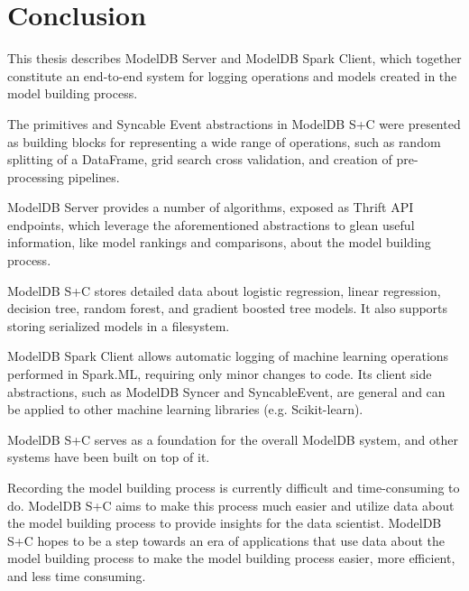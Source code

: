 \chapter{Conclusion}
This thesis describes ModelDB Server and ModelDB Spark Client, which together
constitute an end-to-end system for logging operations and models created in
the model building process.

The primitives and Syncable Event abstractions in ModelDB S+C were presented as
building blocks for representing a wide range of operations, such as random splitting
of a DataFrame, grid search cross validation, and creation of pre-processing pipelines.

ModelDB Server provides a number of algorithms, exposed as Thrift API endpoints, which
leverage the aforementioned abstractions to glean useful information, like model rankings and comparisons,
about the model building process. 

ModelDB S+C stores detailed data about logistic regression, linear regression,
decision tree, random forest, and gradient boosted tree models. It also supports storing
serialized models in a filesystem.

ModelDB Spark Client allows automatic logging of machine learning operations performed in Spark.ML,
requiring only minor changes to code. Its client side abstractions, such as ModelDB Syncer and SyncableEvent, 
are general and can be applied to other machine learning libraries (e.g. Scikit-learn).

ModelDB S+C serves as a foundation for the overall ModelDB system, and other systems have been
built on top of it.

Recording the model building process is currently difficult and time-consuming to do. 
ModelDB S+C aims to make this process much easier and utilize
data about the model building process to provide insights for the data scientist.
ModelDB S+C hopes to be a step towards an era of applications that use data about the model
building process to make the model building process easier, more efficient, and less time consuming.
